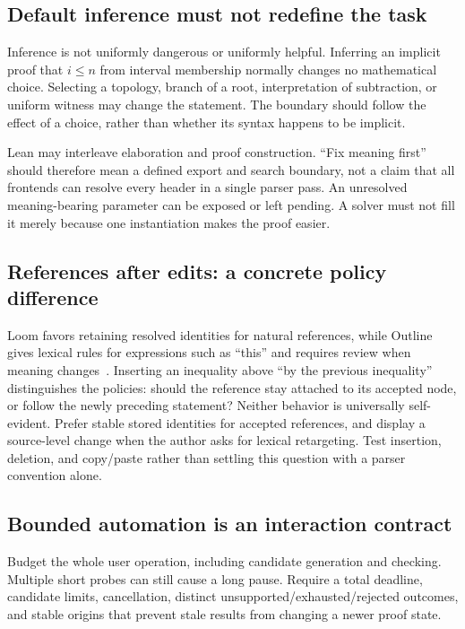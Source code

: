 \documentclass[11pt,letterpaper]{article}
\begin{document}
\subsection{Default inference must not redefine the task}
Inference is not uniformly dangerous or uniformly helpful. Inferring an implicit
proof that \(i\leq n\) from interval membership normally changes no mathematical
choice. Selecting a topology, branch of a root, interpretation of subtraction,
or uniform witness may change the statement. The boundary should follow the
effect of a choice, rather than whether its syntax happens to be implicit.

Lean may interleave elaboration and proof construction. ``Fix meaning first''
should therefore mean a defined export and search boundary, not a claim that all
frontends can resolve every header in a single parser pass. An unresolved
meaning-bearing parameter can be exposed or left pending. A solver must not fill
it merely because one instantiation makes the proof easier.

\subsection{References after edits: a concrete policy difference}
Loom favors retaining resolved identities for natural references, while Outline
gives lexical rules for expressions such as ``this'' and requires review when
meaning changes~\cite[\S3]{loom}\cite[\S5]{outline}. Inserting an inequality above
``by the previous inequality'' distinguishes the policies: should the reference
stay attached to its accepted node, or follow the newly preceding statement?
Neither behavior is universally self-evident. Prefer stable stored identities
for accepted references, and display a source-level change when the author asks
for lexical retargeting. Test insertion, deletion, and copy/paste rather than
settling this question with a parser convention alone.

\subsection{Bounded automation is an interaction contract}
Budget the whole user operation, including candidate generation and checking.
Multiple short probes can still cause a long pause. Require a total deadline,
candidate limits, cancellation, distinct unsupported/exhausted/rejected outcomes,
and stable origins that prevent stale results from changing a newer proof state.
\end{document}

